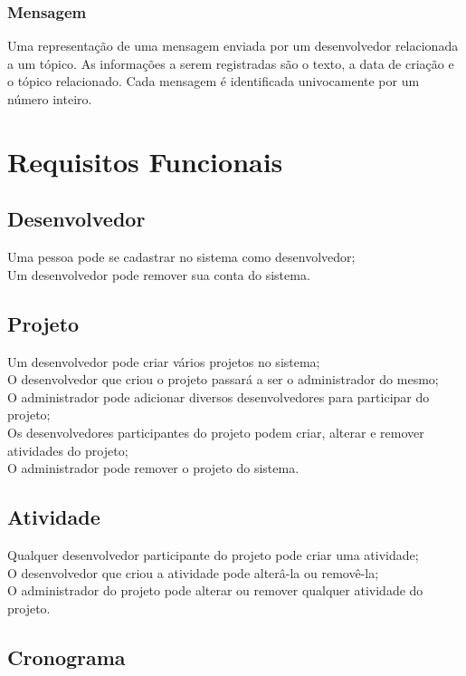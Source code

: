 \documentclass{article}
\begin{document}
		\subsubsection{Mensagem}
		Uma representação de uma mensagem enviada por um desenvolvedor relacionada a um tópico. As informações a serem registradas são o texto, a data de criação e o tópico relacionado. Cada mensagem é identificada univocamente por um número inteiro.



\section{Requisitos Funcionais}

	\subsection{Desenvolvedor}
	Uma pessoa pode se cadastrar no sistema como desenvolvedor;\\
	Um desenvolvedor pode remover sua conta do sistema.

	\subsection{Projeto}
	Um desenvolvedor pode criar vários projetos no sistema;\\
	O desenvolvedor que criou o projeto passará a ser o administrador do mesmo;\\
	O administrador pode adicionar diversos desenvolvedores para participar do projeto;\\
	Os desenvolvedores participantes do projeto podem criar, alterar e remover atividades do projeto;\\
	O administrador pode remover o projeto do sistema.

	\subsection{Atividade}
	Qualquer desenvolvedor participante do projeto pode criar uma atividade;\\
	O desenvolvedor que criou a atividade pode alterâ-la ou removê-la;\\
	O administrador do projeto pode alterar ou remover qualquer atividade do projeto.

	\subsection{Cronograma}
\end{document}
